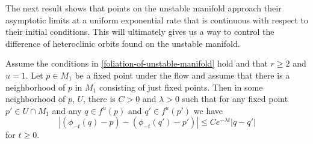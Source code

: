 The next result shows that points on the unstable manifold approach their asymptotic limits at a uniform exponential rate that is continuous with respect to their initial conditions. This will ultimately gives us a way to control the difference of heteroclinic orbits found on the unstable manifold.
\begin{prop}\label{distance-to-fixed-point}
	Assume the conditions in \cref{foliation-of-unstable-manifold} hold and that \(r\geq 2\) and \(u = 1\). Let \(p \in {M}_1\) be a fixed point under the flow and assume that there is a neighborhood of \(p\) in \(M_1\) consisting of just fixed points. Then in some neighborhood of \(p\), \(U\), there is \(C> 0 \) and \(\lambda > 0\) such that for any fixed point \(p'\in U\cap M_1\) and any \(q \in f^u(p)\) and \(q'\in f^u(p')\) we have
	\begin{equation*}
		|(\phi_{-t}(q) - p) - (\phi_{-t}(q') - p')| \leq C e^{-\lambda t} | q - q'|
	\end{equation*}
	for \(t\geq 0.\)
\end{prop}

